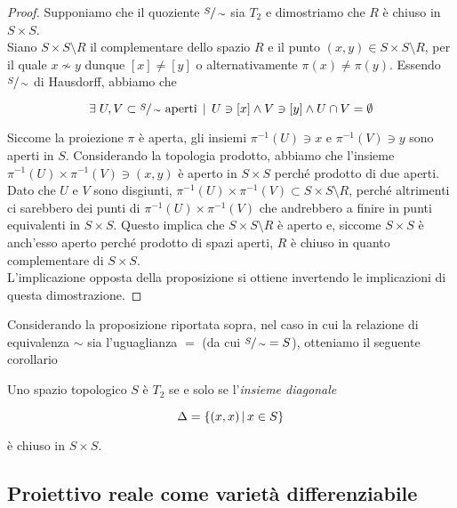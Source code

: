 \begin{proof}\label{solved-es2-3}
	Supponiamo che il quoziente $ \sfrac{S}{\sim} $ sia $ T_{2} $ e dimostriamo che $ R $ è chiuso in $ S \times S $.\\
	Siano $ S \times S \setminus R $ il complementare dello spazio $ R $ e il punto $ (x,y) \in S \times S \setminus R $, per il quale $ x \nsim y $ dunque $ [x] \neq [y] $ o alternativamente $ \pi(x) \neq \pi(y) $. Essendo $ \sfrac{S}{\sim} $ di Hausdorff, abbiamo che
	
	\begin{equation}
		\exists \; U, V \subset \sfrac{S}{\sim} \text{ aperti} \, \mid \, U \ni [x] \wedge V \ni [y] \wedge U \cap V = \emptyset
	\end{equation}
	
	Siccome la proiezione $ \pi $ è aperta, gli insiemi $ \pi^{-1}(U) \ni x $ e $ \pi^{-1}(V) \ni y $ sono aperti in $ S $. Considerando la topologia prodotto, abbiamo che l'insieme $ \pi^{-1}(U) \times \pi^{-1}(V) \ni (x,y) $ è aperto in $ S \times S $ perché prodotto di due aperti. Dato che $ U $ e $ V $ sono disgiunti, $ \pi^{-1}(U) \times \pi^{-1}(V) \subset S \times S \setminus R $, perché altrimenti ci sarebbero dei punti di $ \pi^{-1}(U) \times \pi^{-1}(V) $ che andrebbero a finire in punti equivalenti in $ S \times S $. Questo implica che $ S \times S \setminus R $ è aperto e, siccome $ S \times S $ è anch'esso aperto perché prodotto di spazi aperti, $ R $ è chiuso in quanto complementare di $ S \times S $.\\
	L'implicazione opposta della proposizione si ottiene invertendo le implicazioni di questa dimostrazione.
\end{proof}

Considerando la proposizione riportata sopra, nel caso in cui la relazione di equivalenza $ \sim $ sia l'uguaglianza $ = $ (da cui $ \sfrac{S}{\sim} = S $), otteniamo il seguente corollario

\begin{corollary}
	Uno spazio topologico $ S $ è $ T_{2} $ se e solo se l'\textit{insieme diagonale}
	
	\begin{equation}
		\Delta = \left\{ (x,x) \, \middle| \, x \in S \right\}
	\end{equation}
	
	è chiuso in $ S \times S $.
\end{corollary}

\subsection{Proiettivo reale come varietà differenziabile}

